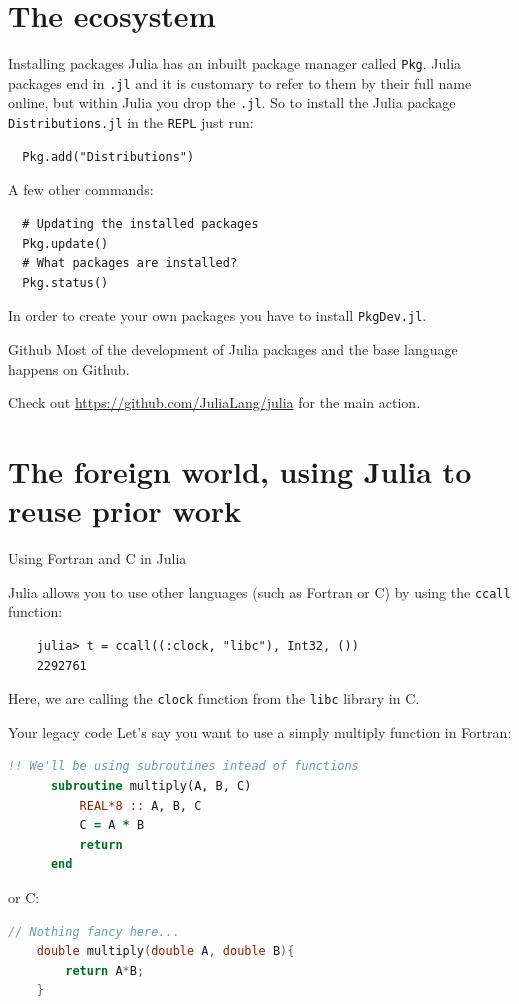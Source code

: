 \documentclass{beamer}
\begin{document}
\section{The ecosystem}
\begin{frame}[fragile]{Installing packages}
  Julia has an inbuilt package manager called \verb|Pkg|. Julia packages end in \verb|.jl|
  and it is customary to refer to them by their full name online, but within Julia you drop the \verb|.jl|.
  So to install the Julia package \verb|Distributions.jl| in the \verb|REPL| just run:

  \begin{lstlisting}
  Pkg.add("Distributions")
  \end{lstlisting}

  A few other commands:
  \begin{lstlisting}
  # Updating the installed packages
  Pkg.update() 
  # What packages are installed?
  Pkg.status()
  \end{lstlisting}
  In order to create your own packages you have to install \verb|PkgDev.jl|.
\end{frame}
\begin{frame}{Github}
  Most of the development of Julia packages and the base language happens on Github.

  Check out \url{https://github.com/JuliaLang/julia} for the main action.
\end{frame}
\section{The foreign world, using Julia to reuse prior work}

\begin{frame}[fragile]{Using Fortran and C in Julia}

Julia allows you to use other languages (such as Fortran or C) by using the \texttt{ccall} function:

\begin{lstlisting}
    julia> t = ccall((:clock, "libc"), Int32, ())
    2292761
\end{lstlisting}

Here, we are calling the \texttt{clock} function from the \texttt{libc} library in C.

\end{frame}

\begin{frame}[fragile]{Your legacy code}
Let's say you want to use a simply multiply function in Fortran:
\begin{lstlisting}[language=fortran]
      !! We'll be using subroutines intead of functions 
      subroutine multiply(A, B, C)
          REAL*8 :: A, B, C
          C = A * B
          return
      end
\end{lstlisting}
\vspace{0.5cm}
or C:
\begin{lstlisting}[language=c]
    // Nothing fancy here...
    double multiply(double A, double B){
        return A*B;
    }
\end{lstlisting}
\end{frame}
\end{document}
